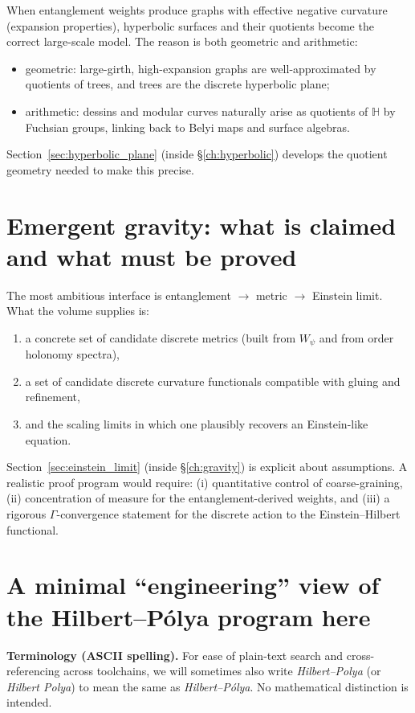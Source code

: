 \documentclass[11pt,oneside]{amsbook}
\numberwithin{equation}{section}
\theoremstyle{plain}
\theoremstyle{definition}
\theoremstyle{remark}
\newcommand{\HH}{\mathbb{H}}
\begin{document}
When entanglement weights produce graphs with effective negative curvature (expansion properties),
hyperbolic surfaces and their quotients become the correct large-scale model.
The reason is both geometric and arithmetic:
\begin{itemize}
\item geometric: large-girth, high-expansion graphs are well-approximated by quotients of trees, and trees are the discrete hyperbolic plane;
\item arithmetic: dessins and modular curves naturally arise as quotients of $\HH$ by Fuchsian groups, linking back to Belyi maps and surface algebras.
\end{itemize}
Section~\ref{sec:hyperbolic_plane} (inside \S\ref{ch:hyperbolic}) develops the quotient geometry needed to make this precise.

\section*{Emergent gravity: what is claimed and what must be proved}

The most ambitious interface is entanglement $\to$ metric $\to$ Einstein limit.
What the volume supplies is:
\begin{enumerate}
\item a concrete set of candidate discrete metrics (built from $W_\psi$ and from order holonomy spectra),
\item a set of candidate discrete curvature functionals compatible with gluing and refinement,
\item and the scaling limits in which one plausibly recovers an Einstein-like equation.
\end{enumerate}
Section~\ref{sec:einstein_limit} (inside \S\ref{ch:gravity}) is explicit about assumptions.
A realistic proof program would require: (i) quantitative control of coarse-graining, (ii) concentration of measure for the entanglement-derived weights, and (iii) a rigorous $\Gamma$-convergence statement for the discrete action to the Einstein--Hilbert functional.

\section*{A minimal ``engineering'' view of the Hilbert--Pólya program here}

\noindent\textbf{Terminology (ASCII spelling).}
For ease of plain-text search and cross-referencing across toolchains, we will sometimes also write \emph{Hilbert--Polya} (or \emph{Hilbert Polya}) to mean the same as \emph{Hilbert--P\'olya}.  No mathematical distinction is intended.
\end{document}
